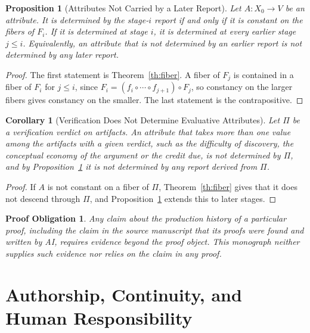 \documentclass[11pt,letterpaper]{report}
\theoremstyle{plain}
\newtheorem{proposition}[theorem]{Proposition}
\newtheorem{corollary}[theorem]{Corollary}
\newtheorem{obligation}[theorem]{Proof Obligation}
\theoremstyle{definition}
\theoremstyle{remark}
\begin{document}
\begin{proposition}[Attributes Not Carried by a Later Report]\label{pr:attributes}
Let $A:X_0\to V$ be an attribute. It is determined by the stage-$i$ report if and only if it is constant on the fibers of $F_i$. If it is determined at stage $i$, it is determined at every earlier stage $j\le i$. Equivalently, an attribute that is not determined by an earlier report is not determined by any later report.
\end{proposition}
\begin{proof}
The first statement is Theorem~\ref{th:fiber}. A fiber of $F_j$ is contained in a fiber of $F_i$ for $j\le i$, since $F_i=(f_i\circ\cdots\circ f_{j+1})\circ F_j$, so constancy on the larger fibers gives constancy on the smaller. The last statement is the contrapositive.
\end{proof}

\begin{corollary}[Verification Does Not Determine Evaluative Attributes]\label{co:evalattrs}
Let $\Pi$ be a verification verdict on artifacts. An attribute that takes more than one value among the artifacts with a given verdict, such as the difficulty of discovery, the conceptual economy of the argument or the credit due, is not determined by $\Pi$, and by Proposition~\ref{pr:attributes} it is not determined by any report derived from $\Pi$.
\end{corollary}
\begin{proof}
If $A$ is not constant on a fiber of $\Pi$, Theorem~\ref{th:fiber} gives that it does not descend through $\Pi$, and Proposition~\ref{pr:attributes} extends this to later stages.
\end{proof}

\begin{obligation}\label{ob:provenance}
Any claim about the production history of a particular proof, including the claim in the source manuscript that its proofs were found and written by AI, requires evidence beyond the proof object. This monograph neither supplies such evidence nor relies on the claim in any proof.
\end{obligation}

\part{Authorship, Continuity, and Human Responsibility}
\end{document}
